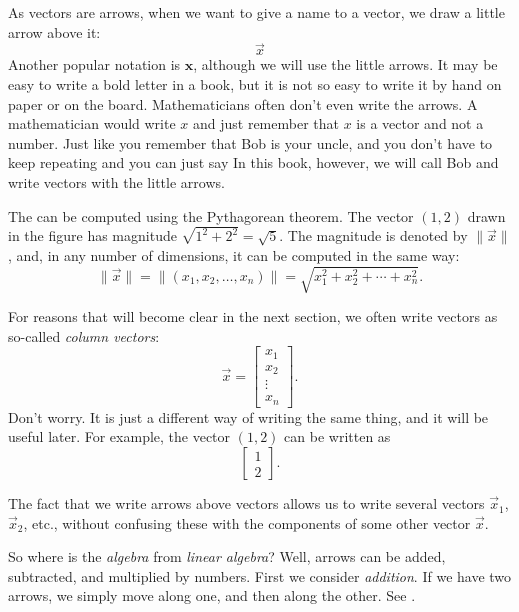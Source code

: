 As vectors are arrows, when we want to give a name to a vector,
we draw a little arrow above it:
\begin{equation*}
\vec{x}
\end{equation*}
Another popular notation is $\mathbf{x}$, although we will use the little
arrows.  It may be easy to write a bold letter in a book, but it is not so
easy to write it by hand on paper or on the board.
Mathematicians often don't even write the arrows.  A mathematician would
write $x$ and just remember that $x$ is a vector and not a number.
Just like you remember that Bob is your uncle, and you don't have to
keep repeating  and you can just say 
In this book, however, we will call Bob 
and write vectors with the little arrows.

The \emph{} can be computed using the Pythagorean theorem.
The vector $(1,2)$ drawn in the figure has magnitude $\sqrt{1^2+2^2} =
\sqrt{5}$.  The magnitude is denoted by $\lVert \vec{x} \rVert$,
and, in any number of dimensions, it can be computed in the same way:
\begin{equation*}
\lVert \vec{x} \rVert
=
\lVert (x_1,x_2,\ldots,x_n) \rVert
=
\sqrt{x_1^2+x_2^2+\cdots+x_n^2} .
\end{equation*}

For reasons that will become clear in the next section, we often
write vectors as so-called
\emph{column vectors}:
\begin{equation*}
\vec{x} = 
\begin{bmatrix}
x_{1} \\ x_2 \\ \vdots \\ x_n
\end{bmatrix} .
\end{equation*}
Don't worry.  It is just a different way of writing the same thing, and
it will be useful later.  For example, the vector $(1,2)$ can be written as
\begin{equation*}
\begin{bmatrix}
1 \\ 2
\end{bmatrix} .
\end{equation*}

The fact that we write arrows above vectors allows us to write several
vectors $\vec{x}_1$, $\vec{x}_2$, etc., without confusing these with the
components of some other vector $\vec{x}$.

So where is the \emph{algebra} from \emph{linear algebra}?
Well, arrows can be added, subtracted,
and multiplied by numbers.
First we consider \emph{addition}.
If we have two arrows, we simply
move along one, and then along the other.  See
.


